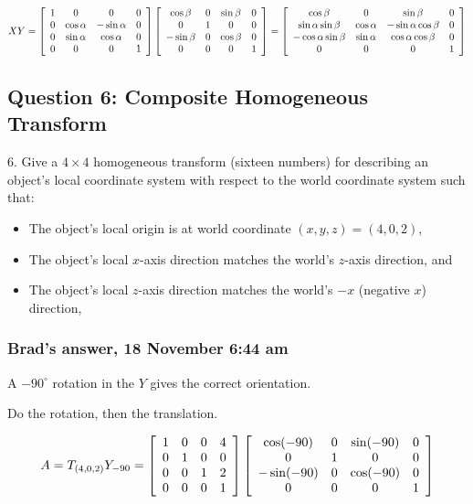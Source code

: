 \documentclass[11pt]{article}
\begin{document}
\begin{spacing}{1.2}
$$XY = 
\left[
\begin{array}{cccc}
	1 & 0 & 0 & 0 \cr
	0 & \cos \alpha & -\sin \alpha & 0 \cr
	0 & \sin \alpha & \cos \alpha & 0 \cr
	0 & 0 & 0 & 1 \cr
\end{array}
\right]
\left[
\begin{array}{cccc}
	\cos \beta & 0 & \sin \beta & 0 \cr
	0 & 1 & 0 & 0 \cr
	-\sin \beta & 0  & \cos \beta & 0 \cr
	0 & 0 & 0 & 1 \cr
\end{array}
\right]
=\left[
\begin{array}{cccc}
	\cos \beta & 0 & \sin \beta & 0 \cr
	\sin \alpha \sin \beta & \cos \alpha & -\sin \alpha \cos \beta & 0 \cr
	-\cos \alpha \sin \beta & \sin \alpha & \cos \alpha \cos \beta & 0 \cr
	0 & 0 & 0 & 1 \cr
\end{array}
\right]
$$


\subsection{Question 6:  Composite Homogeneous Transform}
6.  Give a $4 \times 4$ homogeneous transform (sixteen numbers) for describing an object's local coordinate system with respect to the world coordinate system such that:

\begin{itemize}
	\item The object's local origin is at world coordinate $(x,y,z) = (4,0,2)$,
	\item The object's local $x$-axis direction matches the world's $z$-axis direction, and 
	\item The object's local $z$-axis direction matches the world's $-x$ (negative $x$) direction, 
\end{itemize}

\subsubsection{Brad's answer, 18 November 6:44 am}

A $-90^{\circ}$ rotation in the $Y$ gives the correct orientation. 

Do the rotation, then the translation.  

$$A = T_{(4,0,2)} Y_{-90} = 
\left[
\begin{array}{cccc}
	1 & 0 & 0 & 4 \cr
	0 & 1 & 0 & 0 \cr
	0 & 0 & 1 & 2 \cr
	0 & 0 & 0 & 1 \cr
\end{array}
\right]
\left[
	\begin{array}{cccc}
		\cos (-90) & 0 & \sin (-90) & 0 \cr
		0 & 1 & 0 & 0 \cr
		-\sin(-90) & 0 & \cos (-90) & 0 \cr
		0 & 0 & 0 & 1 \cr
	\end{array}
\right]
$$


\end{spacing}
\end{document}
